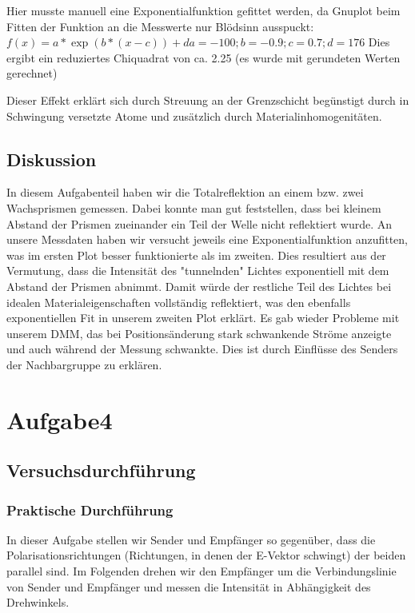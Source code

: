 \documentclass[12pt]{scrartcl}
\begin{document}
Hier musste manuell eine Exponentialfunktion gefittet werden, da Gnuplot beim Fitten der Funktion an die Messwerte nur Blödsinn ausspuckt:
$f(x)= a*\exp(b*(x-c)) +d
a=-100; b=-0.9; c=0.7; d=176$
Dies ergibt ein reduziertes Chiquadrat von ca.
2.25 (es wurde mit gerundeten Werten gerechnet)

Dieser Effekt erklärt sich durch Streuung an der Grenzschicht begünstigt durch in Schwingung versetzte Atome und zusätzlich durch Materialinhomogenitäten.
\subsection{Diskussion}
In diesem Aufgabenteil haben wir die Totalreflektion an einem bzw. zwei Wachsprismen  gemessen. Dabei konnte man gut feststellen, dass bei kleinem Abstand der Prismen zueinander ein Teil der Welle nicht reflektiert wurde. An unsere Messdaten haben wir versucht jeweils eine Exponentialfunktion anzufitten, was im ersten Plot besser funktionierte als im zweiten. Dies resultiert aus der Vermutung, dass die Intensität des "tunnelnden" Lichtes exponentiell mit dem Abstand der Prismen abnimmt. Damit würde der restliche Teil des Lichtes bei idealen Materialeigenschaften vollständig reflektiert, was den ebenfalls exponentiellen Fit in unserem zweiten Plot erklärt. Es gab wieder Probleme mit unserem DMM, das bei Positionsänderung stark schwankende Ströme anzeigte und auch während der Messung schwankte. Dies ist durch Einflüsse des Senders der Nachbargruppe zu erklären.

\section{Aufgabe4}
\subsection{Versuchsdurchführung}
\subsubsection{Praktische Durchführung}
In dieser Aufgabe stellen wir Sender und Empfänger  so gegenüber, dass die Polarisationsrichtungen (Richtungen, in denen der E-Vektor schwingt) der beiden parallel sind. Im Folgenden drehen wir den Empfänger um die Verbindungslinie von Sender und Empfänger und messen die Intensität in Abhängigkeit des Drehwinkels.
\end{document}
